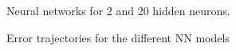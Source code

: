 \documentclass{article}
\begin{document}
\begin{figure}[!h]
  \centering
  \caption{Neural networks for 2 and 20 hidden neurons. }
  \label{fig:semilognn}
\end{figure}

\begin{figure}[!h]
  \centering
  \caption{Error trajectories for the different NN models}
\end{figure}
\end{document}
